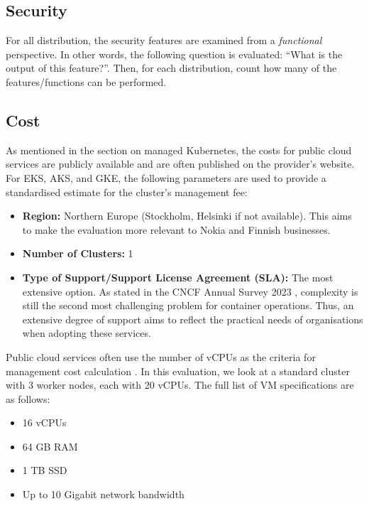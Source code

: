 \subsection{Security}\label{security}

For all distribution, the security features are examined from a
\emph{functional} perspective. In other words, the following question is
evaluated: ``What is the output of this feature?''. Then, for each
distribution, count how many of the features/functions can be performed.

\subsection{Cost}\label{cost}

As mentioned in the section on managed Kubernetes, the costs for public
cloud services are publicly available and are often published on the
provider's website. For EKS, AKS, and GKE, the following parameters are
used to provide a standardised estimate for the cluster's management
fee:

\begin{itemize}
\tightlist
\item
  \textbf{Region:} Northern Europe (Stockholm, Helsinki if not available). This aims to make the
  evaluation more relevant to Nokia and Finnish businesses.
\item
  \textbf{Number of Clusters:} 1
\item
  \textbf{Type of Support/Support License Agreement (SLA):} The most
  extensive option. As stated in the CNCF Annual Survey 2023
  \cite{CNCFAnnualSurvey2024}, complexity is still the second most
  challenging problem for container operations. Thus, an extensive
  degree of support aims to reflect the practical needs of organisations
  when adopting these services.
\end{itemize}

Public cloud services often use the number of vCPUs as the criteria for
management cost calculation
\cite{RedHatOpenShiftc,PricingGoogleKubernetes}. In this evaluation, we
look at a standard cluster with 3 worker nodes, each with 20 vCPUs. The
full list of VM specifications are as follows:

\begin{itemize}
\tightlist
\item
  16 vCPUs
\item
  64 GB RAM
\item
  1 TB SSD
\item
  Up to 10 Gigabit network bandwidth
\end{itemize}

